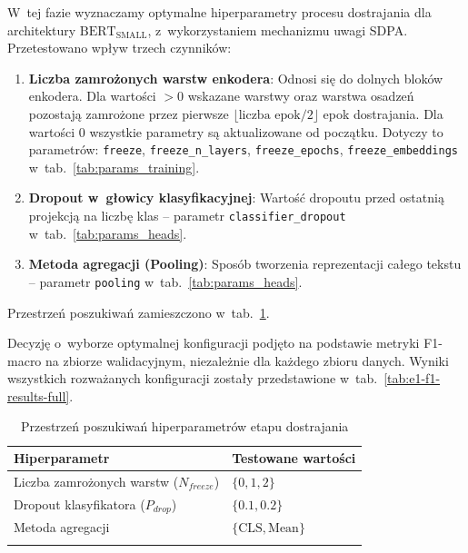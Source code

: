 \documentclass[a4paper,11pt,twoside]{report}
\theoremstyle{definition}
\begin{document}
W~tej fazie wyznaczamy optymalne hiperparametry procesu dostrajania dla architektury $\text{BERT}_{\text{SMALL}}$, z~wykorzystaniem mechanizmu uwagi SDPA. Przetestowano wpływ trzech czynników:
\begin{enumerate}
    \item \textbf{Liczba zamrożonych warstw enkodera}: Odnosi się do dolnych bloków enkodera. Dla wartości $>0$ wskazane warstwy oraz warstwa osadzeń pozostają zamrożone przez pierwsze $\lfloor \text{liczba epok} / 2 \rfloor$ epok dostrajania. Dla wartości $0$ wszystkie parametry są aktualizowane od początku. Dotyczy to parametrów: \texttt{freeze}, \texttt{freeze\_n\_layers}, \texttt{freeze\_epochs}, \texttt{freeze\_embeddings} w~tab.~\ref{tab:params_training}.
    \item \textbf{Dropout w~głowicy klasyfikacyjnej}: Wartość dropoutu przed ostatnią projekcją na liczbę klas -- parametr \texttt{classifier\_dropout} w~tab.~\ref{tab:params_heads}.
    \item \textbf{Metoda agregacji (Pooling)}: Sposób tworzenia reprezentacji całego tekstu -- parametr \texttt{pooling} w~tab.~\ref{tab:params_heads}.
\end{enumerate}
Przestrzeń poszukiwań zamieszczono w~tab.~\ref{tab:grid_e1}.

Decyzję o~wyborze optymalnej konfiguracji podjęto na podstawie metryki F1-macro na zbiorze walidacyjnym, niezależnie dla każdego zbioru danych. Wyniki wszystkich rozważanych konfiguracji zostały przedstawione w~tab.~\ref{tab:e1-f1-results-full}.



\begin{table}[t!]
    \centering
    \caption{Przestrzeń poszukiwań hiperparametrów etapu dostrajania}
    \smallskip
    \label{tab:grid_e1}
    \begin{tabular}{ll}
        \toprule
        \textbf{Hiperparametr} & \textbf{Testowane wartości} \\
        \midrule
        Liczba zamrożonych warstw ($N_{freeze}$) & $\{0, 1, 2\}$ \\
        Dropout klasyfikatora ($P_{drop}$) & $\{0.1, 0.2\}$ \\
        Metoda agregacji & $\{\text{CLS}, \text{Mean} \}$ \\
        \bottomrule
        \multicolumn{2}{l}{\footnotesize}
    \end{tabular}
\end{table}
\end{document}
